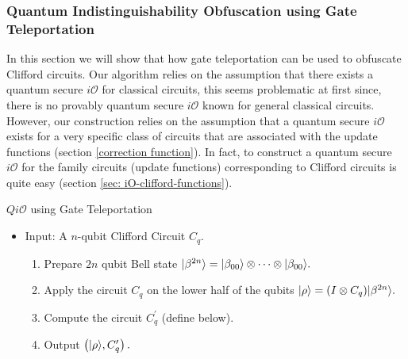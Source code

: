 \subsubsection{Quantum Indistinguishability Obfuscation using Gate Teleportation}
\label{sec:Clifford-iO-teleportaion}
In this section we will show that how gate teleportation can be used to obfuscate Clifford circuits. Our algorithm relies on the assumption that there exists a quantum secure $i\mathcal{O}$ for classical circuits, this seems problematic at first since, there is no provably quantum secure $i\mathcal{O}$ known for general classical circuits. However,  our construction relies on the assumption that a quantum secure $i\mathcal{O}$ exists for a very specific class of circuits that are associated with the update functions (section \ref{correction function}). In fact,  to construct a quantum secure $i\mathcal{O}$ for the family circuits (update functions) corresponding to Clifford circuits is quite easy (section \ref{sec: iO-clifford-functions}).
   


\begin{algorithm}[H]
   \caption{$Qi\mathcal{O}$ using Gate Teleportation}
  \begin{itemize}
  \item Input: A $n$-qubit Clifford Circuit $C_q.$ 
  \begin{enumerate}
  \item Prepare $2n$ qubit Bell state ${\lvert}\beta^{ 2n}\rangle={\lvert}\beta_{00}\rangle\otimes \cdots \otimes {\lvert}\beta_{00}\rangle.$ 
  \item Apply the circuit $C_q$ on the lower half of the qubits ${\lvert}\rho\rangle=(I\otimes C_q) {\lvert}\beta^{2n}\rangle.$ 
  \item Compute the circuit $C_q^\prime$ (define below).
  \item Output $\left({\lvert}\rho\rangle,C_q^\prime \right).$ 
  \end{enumerate}
  \end{itemize} 
\end{algorithm}



